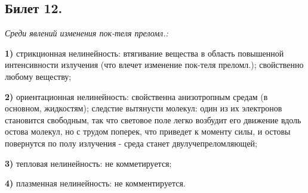 \documentclass[a4paper,12pt]{article}
\theoremstyle{definition} %
\theoremstyle{definition} %
\theoremstyle{remark} %
\begin{document}
\subsection{Билет 12.}


\textit{Среди явлений изменения пок-теля преломл.:} \\
	\par \textbf{1)} стрикционная нелинейность: втягивание вещества в область повышенной интенсивности излучения (что влечет изменение пок-теля преломл.); свойственно любому веществу; \\
	\par \textbf{2)} ориентационная нелинейность: свойственна анизотропным средам (в основном, жидкостям); следстие вытянусти молекул: один из их электронов становится свободным, так что световое поле легко возбудит его движение вдоль остова молекул, но с трудом поперек, что приведет к моменту силы, и остовы повернутся по полу излучения - среда станет двулучепреломляющей; \\
	\par \textbf{3)} тепловая нелинейность: не комметируется; \\
	\par \textbf{4)} плазменная нелинейность: не комментируется.





















	
	
	
\end{document}
